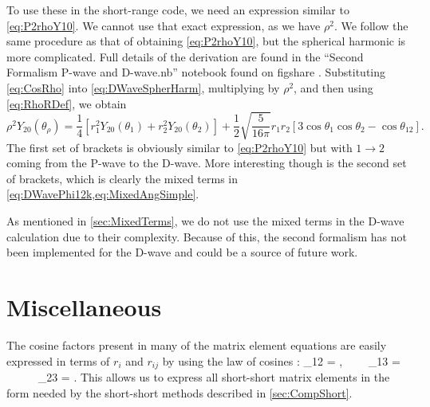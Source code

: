 \documentclass[Dissertation.tex]{subfiles}
\begin{document}
To use these in the short-range code, we need an expression similar to
\cref{eq:P2rhoY10}. We cannot use that exact expression, as we have $\rho^2$. We
follow the same procedure as that of obtaining \cref{eq:P2rhoY10}, but the
spherical harmonic is more complicated. Full details of the derivation are
found in the ``Second Formalism P-wave and D-wave.nb'' notebook found on
figshare \cite{figshare}.
Substituting \cref{eq:CosRho} into \cref{eq:DWaveSpherHarm}, multiplying by
$\rho^2$, and then using \cref{eq:RhoRDef}, we obtain
\begin{equation}
\label{eq:rhoident2}
\rho^2 Y_{20}(\theta_\rho) = \frac{1}{4} \left[r_1^2 Y_{20}(\theta_1) + r_2^2 Y_{20}(\theta_2) \right] + \frac{1}{2} \sqrt{\frac{5}{16 \pi}} 
   r_1 r_2 \left[3 \cos\theta_1 \cos\theta_2 - \cos\theta_{12} \right].
\end{equation}
The first set of brackets is obviously similar to \cref{eq:P2rhoY10} but with
$1 \to 2$ coming from the P-wave to the D-wave. More interesting though is the
second set of brackets, which is clearly the mixed terms in
\cref{eq:DWavePhi12k,eq:MixedAngSimple}.

As mentioned in \cref{sec:MixedTerms}, we do not use the mixed terms in the
D-wave calculation due to their complexity. Because of this, the second
formalism has not been implemented for the D-wave and could be a source of
future work.





\section{Miscellaneous}
\label{sec:Misc}

The cosine factors present in many of the matrix element equations are easily 
expressed in terms of $r_i$ and $r_{ij}$ by using the law of cosines
\cite[p.174]{CRC1978}:
\beq
\label{eq:Cosines}
\cos\theta_{12} = , \ \ \ \ \cos\theta_{13} =  \ \ \   \ \ \cos\theta_{23} = .
\eeq
This allows us to express all short-short matrix elements in the form needed by
the short-short methods described in \cref{sec:CompShort}.



\biblio
\end{document}
